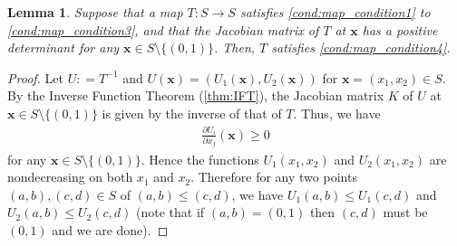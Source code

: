 \documentclass[letterpaper,11pt]{article}
\newtheorem{lemma}[theorem]{Lemma}
\def\defeq{\mathrel{\mathop:}=}%
\begin{document}
\begin{lemma} \label{lem:criterion_C4}
Suppose that a map $T:S\to S$ satisfies \ref{cond:map_condition1} to \ref{cond:map_condition3}, and that the Jacobian matrix of $T$ at $\mathbf{x}$ has a positive determinant for any $\mathbf{x}\in S\setminus \{(0,1)\}$.
Then, $T$ satisfies \ref{cond:map_condition4}.
\end{lemma}
\begin{proof}
Let $U\defeq T^{-1}$ and $U(\mathbf{x})=(U_1(\mathbf{x}),U_2(\mathbf{x}))$ for $\mathbf{x}=(x_1,x_2)\in S$.
By the Inverse Function Theorem (\cref{thm:IFT}), the Jacobian matrix $K$ of $U$ at $\mathbf{x}\in S\setminus\{(0,1)\}$ is given by the inverse of that of $T$.
Thus, we have
\begin{align*}
\frac{\partial U_i}{\partial x_j}(\mathbf{x})\geq 0
\end{align*}
for any $\mathbf{x}\in S\setminus \{(0,1)\}$.
Hence the functions $U_1(x_1,x_2)$ and $U_2(x_1,x_2)$ are nondecreasing on both $x_1$ and $x_2$.
Therefore for any two points $(a,b),(c,d)\in S$ of $(a,b)\leq (c,d)$, we have $U_1(a,b) \leq U_1(c,d)$ and $U_2(a,b)\leq U_2(c,d)$ (note that if $(a,b)=(0,1)$ then $(c,d)$ must be $(0,1)$ and we are done).
\end{proof}
\end{document}
